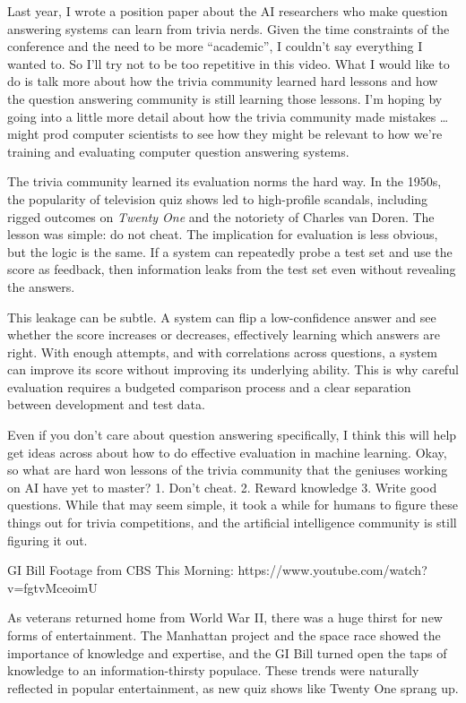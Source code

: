 Last year, I wrote a position paper about the AI researchers who make question answering systems can learn from trivia nerds.  Given the time constraints of the conference and the need to be more “academic”, I couldn’t say everything I wanted to.  So I’ll try not to be too repetitive in this video.  What I would like to do is talk more about how the trivia community learned hard lessons and how the question answering community is still learning those lessons.  I’m hoping by going into a little more detail about how the trivia community made mistakes … might prod computer scientists to see how they might be relevant to how we’re training and evaluating computer question answering systems.


The trivia community learned its evaluation norms the hard way. In the 1950s,
the popularity of television quiz shows led to high-profile scandals, including
rigged outcomes on \emph{Twenty One} and the notoriety of Charles van
Doren.
The lesson was simple: do not cheat. The implication for  evaluation is
less obvious, but the logic is the same. If a system can repeatedly probe a
test set and use the score as feedback, then information leaks from the test
set even without revealing the answers.

This leakage can be subtle. A system can flip a low-confidence answer and see
whether the score increases or decreases, effectively learning which answers
are right. With enough attempts, and with correlations across questions, a
system can improve its score without improving its underlying ability. This is
why careful evaluation requires a budgeted comparison process and a clear
separation between development and test data.


Even if you don’t care about question answering specifically, I think this will help get ideas across about how to do effective evaluation in machine learning.
Okay, so what are hard won lessons of the trivia community that the geniuses working on AI have yet to master?  1.  Don’t cheat.  2.  Reward knowledge 3. Write good questions.  While that may seem simple, it took a while for humans to figure these things out for trivia competitions, and the artificial intelligence community is still figuring it out.

GI Bill Footage from CBS This Morning:
https://www.youtube.com/watch?v=fgtvMceoimU

As veterans returned home from World War II, there was a huge thirst for new forms of entertainment.  The Manhattan project and the space race showed the importance of knowledge and expertise, and the GI Bill turned open the taps of knowledge to an information-thirsty populace.  These trends were naturally reflected in popular entertainment, as new quiz shows like Twenty One sprang up.

